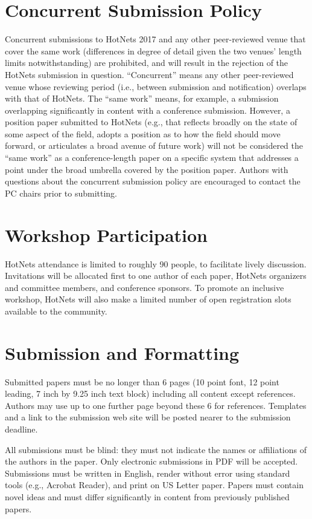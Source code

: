 \documentclass{hotnets17}
\begin{document}
\section{Concurrent Submission Policy}

Concurrent submissions to HotNets 2017 and any other peer-reviewed
venue that cover the same work (differences in degree of detail given
the two venues’ length limits notwithstanding) are prohibited, and
will result in the rejection of the HotNets submission in
question. ``Concurrent'' means any other peer-reviewed venue whose
reviewing period (i.e., between submission and notification) overlaps
with that of HotNets. The ``same work'' means, for example, a submission
overlapping significantly in content with a conference
submission. However, a position paper submitted to HotNets (e.g., that
reflects broadly on the state of some aspect of the field, adopts a
position as to how the field should move forward, or articulates a
broad avenue of future work) will not be considered the ``same work'' as
a conference-length paper on a specific system that addresses a point
under the broad umbrella covered by the position paper. Authors with
questions about the concurrent submission policy are encouraged to
contact the PC chairs prior to submitting.

\section{Workshop Participation}

HotNets attendance is limited to roughly 90 people, to facilitate
lively discussion. Invitations will be allocated first to one author
of each paper, HotNets organizers and committee members, and
conference sponsors. To promote an inclusive workshop, HotNets will
also make a limited number of open registration slots available to the
community.

\section{Submission and Formatting}

Submitted papers must be no longer than 6 pages (10 point font, 12
point leading, 7 inch by 9.25 inch text block) including all content
except references. Authors may use up to one further page beyond these
6 for references. Templates and a link to the submission web site will
be posted nearer to the submission deadline.

All submissions must be blind: they must not indicate the names or
affiliations of the authors in the paper. Only electronic submissions
in PDF will be accepted. Submissions must be written in English,
render without error using standard tools (e.g., Acrobat Reader), and
print on US Letter paper. Papers must contain novel ideas and must
differ significantly in content from previously published papers.
\end{document}
